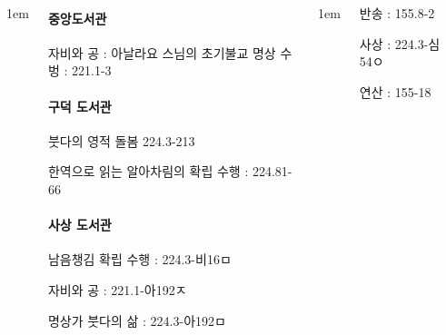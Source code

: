 \documentclass[	20pt, 
							a1paper, 
							portrait, %
							margin=0mm, %
							innermargin=10mm,  		%
							colspace=5mm, 
							subcolspace=0mm
							]{tikzposter}
\begin{document}
\begin{columns}
{\begin{LARGE}
				\end{LARGE}
			} %

			{
					\setlength{\leftmargini}{4em}
					\setlength{\labelsep} {1em}
				\begin{LARGE}

		\paragraph{중앙도서관}

		자비와 공 : 아날라요 스님의 초기불교 명상 수벙 : 221.1-3

		\paragraph{		구덕 도서관}

		붓다의 영적 돌봄 224.3-213

		한역으로 읽는 알아차림의 확립 수행 : 224.81-66

		\paragraph{사상 도서관}

		남음챙김 확립 수행 : 224.3-비16ㅁ

		자비와 공 : 221.1-아192ㅈ

		명상가 붓다의 삶 : 224.3-아192ㅁ

				\end{LARGE}
			} %


			{
					\setlength{\leftmargini}{4em}
					\setlength{\labelsep} {1em}
				\begin{LARGE}
반송  : 155.8-2  %

사상  :  224.3-심54ㅇ %

연산  :  155-18    %



				\end{LARGE}
			}



	\end{columns}
\end{document}
